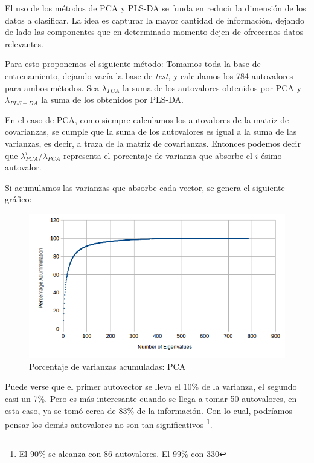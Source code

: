 El uso de los m\'etodos de PCA y PLS-DA se funda en reducir la dimensi\'on de los datos a clasificar. La idea es capturar la mayor cantidad de informaci\'on, dejando de lado las componentes que en determinado momento dejen de ofrecernos datos relevantes.

Para esto proponemos el siguiente m\'etodo: Tomamos toda la base de entrenamiento, dejando vac\'ia la base de \textit{test}, y calculamos los 784 autovalores para ambos m\'etodos. Sea $\lambda_{PCA}$ la suma de los autovalores obtenidos por PCA y $\lambda_{PLS-DA}$ la suma de los obtenidos por PLS-DA.

En el caso de PCA, como siempre calculamos los autovalores de la matriz de covarianzas, se cumple que la suma de los autovalores es igual a la suma de las varianzas, es decir, a traza de la matriz de covarianzas. Entonces podemos decir que $\lambda_{PCA}^{i} / \lambda_{PCA}$ representa el porcentaje de varianza que absorbe el $i$-\'esimo autovalor.

Si acumulamos las varianzas que absorbe cada vector, se genera el siguiente gr\'afico:

\begin{figure}[h!]
  \begin{center}
	\includegraphics[scale=1]{exp4/PCA-percentage.png}
	\caption{Porcentaje de varianzas acumuladas: PCA}
	\label{accum_var_PCA}
  \end{center}
\end{figure}

Puede verse que el primer autovector se lleva el 10\% de la varianza, el segundo casi un 7\%. Pero es m\'as interesante cuando se llega a tomar 50 autovalores, en esta caso, ya se tom\'o cerca de 83\% de la informaci\'on. Con lo cual, podr\'iamos pensar los dem\'as autovalores no son tan significativos \footnote{El 90\% se alcanza con 86 autovalores. El 99\% con 330}.


